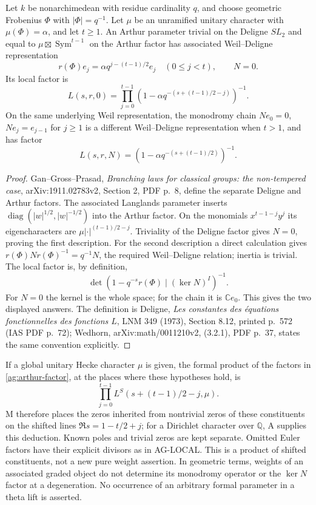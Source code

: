 \begin{proposition}
Let $k$ be nonarchimedean with residue cardinality $q$, and choose
geometric Frobenius $\Phi$ with $|\Phi|=q^{-1}$. Let $\mu$ be an
unramified unitary character with $\mu(\Phi)=\alpha$, and let
$t\ge1$. An Arthur parameter trivial on the Deligne $SL_2$
and equal to $\mu\boxtimes\operatorname{Sym}^{t-1}$ on the
Arthur factor has associated Weil--Deligne representation
\[
 r(\Phi)e_j=\alpha q^{j-(t-1)/2}e_j\quad(0\le j<t),
 \qquad N=0.
\]
Its local factor is
\begin{equation}\label{ag:arthur-factor}
 L(s,r,0)=\prod_{j=0}^{t-1}
       (1-\alpha q^{-(s+(t-1)/2-j)})^{-1}.
\end{equation}
On the same underlying Weil representation, the monodromy chain
$Ne_0=0$, $Ne_j=e_{j-1}$ for $j\ge1$ is a different
Weil--Deligne representation when $t>1$, and has factor
\[
 L(s,r,N)=(1-\alpha q^{-(s+(t-1)/2)})^{-1}.
\]
\end{proposition}
\begin{proof}
Gan--Gross--Prasad, \emph{Branching laws for classical groups:
the non-tempered case}, arXiv:1911.02783v2, Section 2,
PDF p.~8, define the separate Deligne and Arthur factors.
The associated Langlands parameter inserts
$\operatorname{diag}(|w|^{1/2},|w|^{-1/2})$ into the Arthur
factor. On the monomials $x^{t-1-j}y^j$ its eigencharacters
are $\mu|\cdot|^{(t-1)/2-j}$. Triviality of the Deligne
factor gives $N=0$, proving the first description.
For the second description a direct calculation gives
$r(\Phi)Nr(\Phi)^{-1}=q^{-1}N$, the required
Weil--Deligne relation; inertia is trivial.
The local factor is, by definition,
\[
 \det(1-q^{-s}r(\Phi)\mid(\ker N)^I)^{-1}.
\]
For $N=0$ the kernel is the whole space; for the chain it is
$\mathbb C e_0$. This gives the two displayed answers.
The definition is Deligne, \emph{Les constantes des équations
fonctionnelles des fonctions $L$}, LNM 349 (1973),
Section 8.12, printed p.~572 (IAS PDF p.~72);
Wedhorn, arXiv:math/0011210v2, (3.2.1), PDF p.~37,
states the same convention explicitly.
\end{proof}

If a global unitary Hecke character $\mu$ is given, the formal
product of the factors in \eqref{ag:arthur-factor}, at the places
where these hypotheses hold, is
\[
 \prod_{j=0}^{t-1}L^S(s+(t-1)/2-j,\mu).
\]
M therefore places the zeros inherited from nontrivial zeros of
these constituents on the shifted lines $\Re s=1-t/2+j$;
for a Dirichlet character over $\mathbb Q$, A supplies this
deduction. Known poles and trivial zeros are kept separate.
Omitted Euler factors have their explicit divisors as in AG-LOCAL.
This is a product of shifted constituents, not a new pure
weight assertion. In geometric terms, weights of an associated
graded object do not determine its monodromy operator or the
$\ker N$ factor at a degeneration. No occurrence of an arbitrary
formal parameter in a theta lift is asserted.

